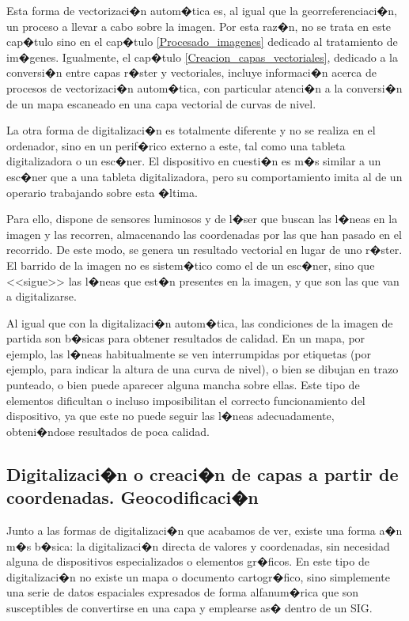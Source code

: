 Esta forma de vectorizaci�n autom�tica es, al igual que la georreferenciaci�n, un proceso a llevar a cabo sobre la imagen. Por esta raz�n, no se trata en este cap�tulo sino en el cap�tulo \ref{Procesado_imagenes} dedicado al tratamiento de im�genes. Igualmente, el cap�tulo \ref{Creacion_capas_vectoriales}, dedicado a la conversi�n entre capas r�ster y vectoriales, incluye informaci�n acerca de procesos de vectorizaci�n autom�tica, con particular atenci�n a la conversi�n de un mapa escaneado en una capa vectorial de curvas de nivel.

La otra forma de digitalizaci�n es totalmente diferente y no se realiza en el ordenador, sino en un perif�rico externo a este, tal como una tableta digitalizadora o un esc�ner. El dispositivo en cuesti�n es m�s similar a un esc�ner que a una tableta digitalizadora, pero su comportamiento imita al de un operario trabajando sobre esta �ltima.

Para ello, dispone de sensores luminosos y de l�ser que buscan las l�neas en la imagen y las recorren, almacenando las coordenadas por las que han pasado en el recorrido. De este modo, se genera un resultado vectorial en lugar de uno r�ster. El barrido de la imagen no es sistem�tico como el de un esc�ner, sino que <<sigue>> las l�neas que est�n presentes en la imagen, y que son las que van a digitalizarse. 

Al igual que con la digitalizaci�n autom�tica, las condiciones de la imagen de partida son b�sicas para obtener resultados de calidad. En un mapa, por ejemplo, las l�neas habitualmente se ven interrumpidas por etiquetas (por ejemplo, para indicar la altura de una curva de nivel), o bien se dibujan en trazo punteado, o bien puede aparecer alguna mancha sobre ellas. Este tipo de elementos dificultan o incluso imposibilitan el correcto funcionamiento del dispositivo, ya que este no puede seguir las l�neas adecuadamente, obteni�ndose resultados de poca calidad.

\subsection{Digitalizaci�n o creaci�n de capas a partir de coordenadas. Geocodificaci�n}
\label{Geocodificacion}


Junto a las formas de digitalizaci�n que acabamos de ver, existe una forma a�n m�s b�sica: la digitalizaci�n directa de valores y coordenadas, sin necesidad alguna de dispositivos especializados o elementos gr�ficos. En este tipo de digitalizaci�n no existe un mapa o documento cartogr�fico, sino simplemente una serie de datos espaciales expresados de forma alfanum�rica que son susceptibles de convertirse en una capa y emplearse as� dentro de un SIG.

